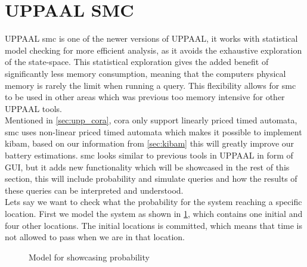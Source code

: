 \section{UPPAAL SMC}\label{sec:smc}
UPPAAL \gls{smc} is one of the newer versions of UPPAAL, it works with statistical model checking for more efficient analysis, as it avoids the exhaustive exploration of the state-space. This statistical exploration gives the added benefit of significantly less memory consumption, meaning that the computers physical memory is rarely the limit when running a query. This flexibility allows for \gls{smc} to be used in other areas which was previous too memory intensive for other UPPAAL tools\cite{cs_smc}. \\
Mentioned in \cref{sec:upp_cora}, \gls{cora} only support linearly priced timed automata, \gls{smc} uses non-linear priced timed automata which makes it possible to implement \gls{kibam}, based on our information from \cref{sec:kibam} this will greatly improve our battery estimations. \gls{smc} looks similar to previous tools in UPPAAL in form of GUI, but it adds new functionality which will be showcased in the rest of this section, this will include probability and simulate queries and how the results of these queries can be interpreted and understood. \\
Lets say we want to check what the probability for the system reaching a specific location. First we model the system as shown in \cref{fig:example}, which contains one initial and four other locations. The initial locations is committed, which means that time is not allowed to pass when we are in that location.

\begin{figure}[H]
	\centering
	\caption{Model for showcasing probability}
	\label{fig:example}
\end{figure}

